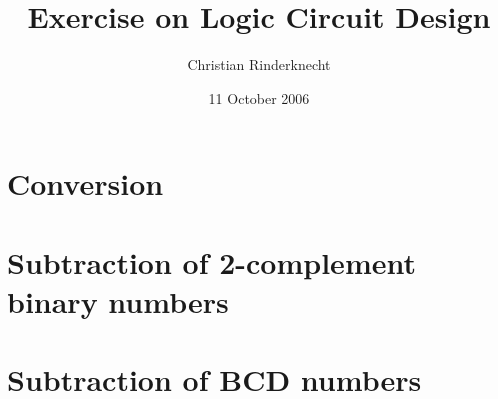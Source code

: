 \documentclass[11pt,a4paper]{article}
\title{Exercise on Logic Circuit Design}
\author{Christian Rinderknecht}
\date{11 October 2006}
\begin{document}
\maketitle
\thispagestyle{empty}

\section{Conversion}




\section{Subtraction of 2-complement binary numbers}




\section{Subtraction of BCD numbers}



\end{document}
